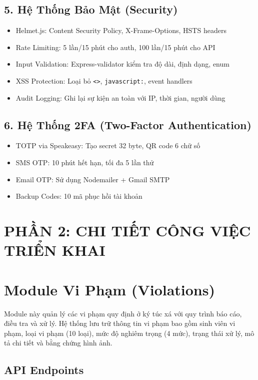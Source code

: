 \documentclass[10pt,a4paper]{article}
\begin{document}
\subsection*{5. Hệ Thống Bảo Mật (Security)}
\begin{itemize}[nosep]
    \item Helmet.js: Content Security Policy, X-Frame-Options, HSTS headers
    \item Rate Limiting: 5 lần/15 phút cho auth, 100 lần/15 phút cho API
    \item Input Validation: Express-validator kiểm tra độ dài, định dạng, enum
    \item XSS Protection: Loại bỏ \texttt{<>}, \texttt{javascript:}, event handlers
    \item Audit Logging: Ghi lại sự kiện an toàn với IP, thời gian, người dùng
\end{itemize}

\subsection*{6. Hệ Thống 2FA (Two-Factor Authentication)}
\begin{itemize}[nosep]
    \item TOTP via Speakeasy: Tạo secret 32 byte, QR code 6 chữ số
    \item SMS OTP: 10 phút hết hạn, tối đa 5 lần thử
    \item Email OTP: Sử dụng Nodemailer + Gmail SMTP
    \item Backup Codes: 10 mã phục hồi tài khoản
\end{itemize}

\newpage


\section*{PHẦN 2: CHI TIẾT CÔNG VIỆC TRIỂN KHAI}

\section{Module Vi Phạm (Violations)}

Module này quản lý các vi phạm quy định ở ký túc xá với quy trình báo cáo, điều tra và xử lý. Hệ thống lưu trữ thông tin vi phạm bao gồm sinh viên vi phạm, loại vi phạm (10 loại), mức độ nghiêm trọng (4 mức), trạng thái xử lý, mô tả chi tiết và bằng chứng hình ảnh.


\subsection{API Endpoints}
\end{document}
